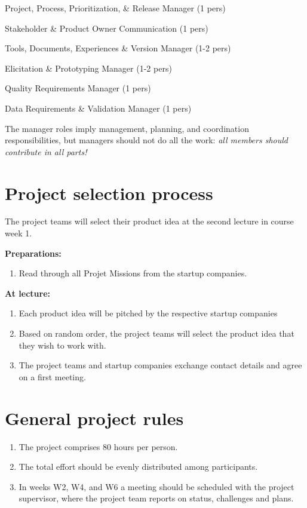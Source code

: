 \documentclass[10pt,a4paper]{article}
\begin{document}
\begin{description}[noitemsep]
\item[P3RM] Project, Process, Prioritization, \& Release Manager (1 pers)
\item[SPOC] Stakeholder \& Product Owner Communication (1 pers)
\item[TDEVM] Tools, Documents, Experiences \& Version Manager (1-2 pers)
\item[EPM] Elicitation \& Prototyping Manager (1-2 pers)
\item[QRM] Quality Requirements Manager (1 pers)
\item[DRVM] Data Requirements \& Validation Manager (1 pers)
\end{description}

\noindent The manager roles imply management, planning, and coordination responsibilities, but managers should not do all the work: {\it all members should contribute in all parts!}

\section{Project selection process}
\noindent The project teams will select their product idea at the second lecture in course week 1.
\newline

\noindent\textbf{Preparations:}
\begin{enumerate}[noitemsep]
  \item Read through all Projet Missions from the startup companies.
\end{enumerate}
\noindent\textbf{At lecture:}
\begin{enumerate}[noitemsep]
  \item Each product idea will be pitched by the respective startup companies
  \item Based on random order, the project teams will select the product idea that they wish to work with.
  \item The project teams and startup companies exchange contact details and agree on a first meeting.
\end{enumerate}

\section{General project rules}
\begin{enumerate}[noitemsep]
\item The project comprises 80 hours per person.
\item The total effort should be evenly distributed among participants.
\item In weeks W2, W4, and W6 a meeting should be scheduled with the project supervisor, where the project team reports on status, challenges and plans.
\end{enumerate}
\end{document}
